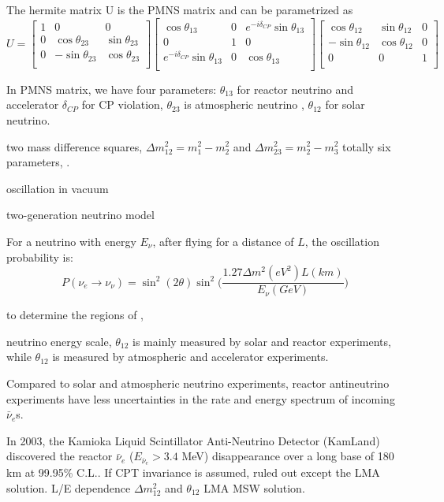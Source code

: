 \documentclass[preprint,12pt]{elsarticle}
\begin{document}
The hermite matrix U is the PMNS matrix and can be parametrized as
\[
U=
\begin{bmatrix}
1 &0 &0\\
0 &\cos\theta_{23} &\sin\theta_{23}\\
0 &-\sin\theta_{23} &\cos\theta_{23}\\ 
\end{bmatrix}
\begin{bmatrix}
\cos\theta_{13} &0 &e^{-i\delta_{CP}}\sin\theta_{13}\\
0 &1 &0\\
e^{-i\delta_{CP}}\sin\theta_{13} &0 &\cos\theta_{13}\\ 
\end{bmatrix}
\begin{bmatrix}
\cos\theta_{12} &\sin\theta_{12} &0\\
-\sin\theta_{12} &\cos\theta_{12} &0\\
0 &0 &1\\ 
\end{bmatrix}
\]

In PMNS matrix, we have four parameters:
$\theta_{13}$ for reactor neutrino and accelerator
$\delta_{CP}$ for CP violation, $\theta_{23}$ is atmospheric neutrino , $\theta_{12}$ for solar neutrino. 


two mass difference squares, $\Delta m^2_{12}=m_1^2-m_2^2$ and $\Delta m^2_{23}=m_2^2-m_3^2$
totally six parameters, .

oscillation in vacuum

two-generation neutrino model

For a neutrino with energy $E_\nu$, after flying for a distance of $L$, the oscillation probability is: 
\[
P(\nu_e\to\nu_{\nu})=\sin^2(2\theta)\sin^2\Big(\frac{1.27\Delta m^2(eV^2)L(km)}{E_\nu(GeV)}\Big)
\]



to determine the regions of , 


neutrino energy scale, 
$\theta_{12}$ is mainly measured by solar and reactor experiments, while $\theta_{12}$ is measured by atmospheric and accelerator experiments. 






Compared to solar and atmospheric neutrino experiments, reactor antineutrino experiments have 
less uncertainties in the rate and energy spectrum of incoming $\bar{\nu}_e$s.
  
In 2003, the Kamioka Liquid Scintillator Anti-Neutrino Detector (KamLand) discovered the reactor $\bar{\nu}_e$ ($E_{\bar{\nu}_e}>3.4$ MeV) disappearance over a long base of 180 km at 99.95\% C.L.. 
If CPT invariance is assumed, 
ruled out except the LMA solution\cite{kamland}.
L/E dependence 
$\Delta m_{12}^2$ and $\theta_{12}$
LMA MSW solution.
\end{document}
